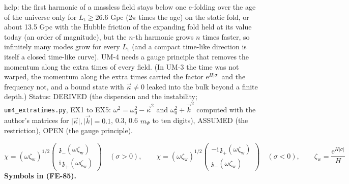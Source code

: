 \documentclass[
  10pt,
]{article}
\begin{document}
help: the first harmonic of a massless field stays below one e-folding
over the age of the universe only for \(L_{\mathrm{t}} \ge 26.6\) Gpc
(\(2\pi\) times the age) on the static fold, or about 13.5 Gpc with the
Hubble friction of the expanding fold held at its value today (an order
of magnitude), but the \(n\)-th harmonic grows \(n\) times faster, so
infinitely many modes grow for every \(L_{\mathrm{t}}\) (and a compact
time-like direction is itself a closed time-like curve). UM-4 needs a
gauge principle that removes the momentum along the extra times of every
field. (In UM-3 the time was not warped, the momentum along the extra
times carried the factor \(\mathrm{e}^{H\lvert\sigma\rvert}\) and the
frequency not, and a bound state with \(\vec\kappa \ne 0\) leaked into
the bulk beyond a finite depth.) Status: DERIVED (the dispersion and the
instability; \texttt{um4\_extratimes.py}, EX1 to EX5:
\(\omega^2 = \omega_0^2 - \vec\kappa^2\) and \(\omega_0^2 + \vec k^2\)
computed with the author's matrices for
\(\lvert\vec\kappa\rvert, \lvert\vec k\rvert = 0.1\), 0.3, 0.6
\(m_\Psi\) to ten digits), ASSUMED (the restriction), OPEN (the gauge
principle).

\[
\chi = (\omega\zeta_{\mathrm{w}})^{1/2}\begin{pmatrix}\mathfrak{z}_-(\omega\zeta_{\mathrm{w}})\\ \mathrm{i}\,\mathfrak{z}_+(\omega\zeta_{\mathrm{w}})\end{pmatrix}\quad(\sigma > 0),\qquad
\chi = (\omega\zeta_{\mathrm{w}})^{1/2}\begin{pmatrix}-\mathrm{i}\,\mathfrak{z}_+(\omega\zeta_{\mathrm{w}})\\ \mathfrak{z}_-(\omega\zeta_{\mathrm{w}})\end{pmatrix}\quad(\sigma < 0),\qquad
\zeta_{\mathrm{w}} = \frac{\mathrm{e}^{H\lvert\sigma\rvert}}{H} \tag{FE-85}
\] \textbf{Symbols in (FE-85).}
\end{document}
